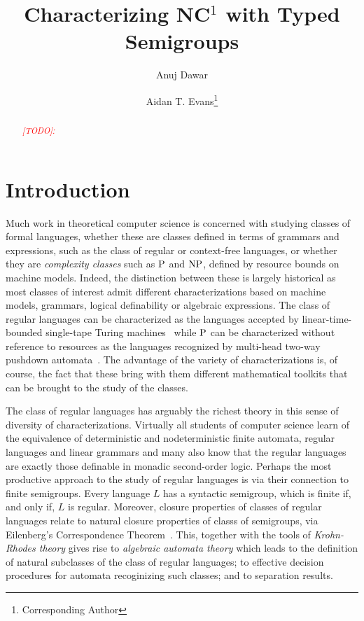 \documentclass[a4paper,UKenglish,cleveref, autoref, thm-restate, anonymous]{lipics-v2021}
\title{Characterizing NC${}^1$ with Typed Semigroups} %
\author{Anuj Dawar}{Department of Computer Science and Technology, University of Cambridge, United Kingdom \and \url{https://www.cl.cam.ac.uk/~ad260/} }{anuj.dawar@cl.cam.ac.uk}{https://orcid.org/0000-0003-4014-8248}{(Optional) author-specific funding acknowledgements}%
\author{Aidan T. Evans\footnote{Corresponding Author}}{Department of Computer Science and Technology, University of Cambridge, United Kingdom \and \url{https://www.aidantevans.com/} }{ate26@cam.ac.uk}{https://orcid.org/0009-0007-9084-3608}{[funding]}
\newcommand{\todo}[1]{\textit{\textcolor{red}{[TODO]: #1}}}
\begin{document}


\maketitle

\begin{abstract}
    \todo{}
\end{abstract}

\newpage

\section{Introduction}


Much work in theoretical computer science is concerned with studying classes of formal languages, whether these are classes defined in terms of grammars and expressions, such as the class of regular or context-free languages, or whether they are \emph{complexity classes} such as $\mathrm{P}$ and $\mathrm{NP}$, defined by resource bounds on machine models.  Indeed, the distinction between these is largely historical as most classes of interest admit different characterizations based on machine models, grammars, logical definability or algebraic expressions.  The class of regular languages can be characterized as the languages accepted by linear-time-bounded single-tape Turing machines~\cite{hennie1965one} while $\mathrm{P}$ can be characterized without reference to resources as the languages recognized by multi-head two-way pushdown automata~\cite{cook1971characterizations}.  The advantage of the variety of characterizations is, of course, the fact that these bring with them different mathematical toolkits that can be brought to the study of the classes.

The class of regular languages has arguably the richest theory in this sense of diversity of characterizations.  Virtually all students of computer science learn of the equivalence of deterministic and nodeterministic finite automata, regular languages and linear grammars and many also know that the regular languages are exactly those definable in monadic second-order logic.  Perhaps the most productive approach to the study of regular languages is via their connection to finite semigroups.  Every language $L$ has a syntactic semigroup, which is finite if, and only if, $L$ is regular.  Moreover, closure properties of classes of regular languages relate to natural closure properties of classs of semigroups, via Eilenberg's Correspondence Theorem~\cite{eilenberg1976automata}.  This, together with the tools of  \emph{Krohn-Rhodes theory} gives rise to \emph{algebraic automata theory} which leads to the definition of natural subclasses of the class of regular languages; to effective decision procedures for automata recoginizing such classes; and to separation results.
\end{document}
